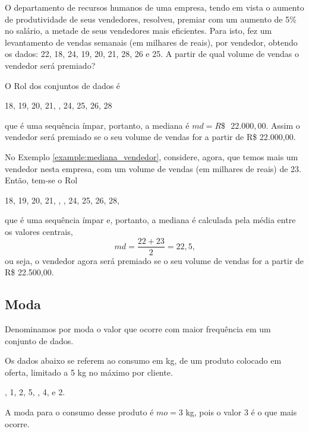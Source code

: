\documentclass[11pt,fleqn]{book}
\numberwithin{mpicture}{chapter}
\numberwithin{mtable}{chapter}
\numberwithin{mframe}{chapter}
\begin{document}
\begin{example}
	\label{example:mediana_vendedor}
	O departamento de recursos humanos de uma empresa, tendo em vista o aumento de produtividade de seus vendedores, resolveu, premiar com um aumento de 5\% no salário, a metade de seus vendedores mais eficientes. Para isto, fez um levantamento de vendas semanais (em milhares de reais), por vendedor, obtendo os dados: 22, 18, 24, 19, 20, 21, 28, 26 e 25. A partir de qual volume de vendas o vendedor será premiado?
	
	O Rol dos conjuntos de dados é
	\begin{center}
		18, 19, 20, 21, , 24, 25, 26, 28\text{,}
	\end{center}
	que é uma sequência ímpar, portanto, a mediana é $md=R\$\text{ }22.000,00$. Assim o vendedor será premiado se o seu volume de vendas for a partir de R\$ 22.000,00.
\end{example}

\begin{example}
	No Exemplo \ref{example:mediana_vendedor}, considere, agora, que temos mais um vendedor nesta empresa, com um volume de vendas (em milhares de reais) de 23. Então, tem-se o Rol
	\begin{center}
		18, 19, 20, 21, , , 24, 25, 26, 28,
	\end{center}
	que é uma sequência ímpar e, portanto, a mediana é calculada pela média entre os valores centrais,
	\[
		md=\frac{22 + 23}{2}=22,5\text{,}
	\]
	ou seja, o vendedor agora será premiado se o seu volume de vendas for a partir de R\$ 22.500,00.
\end{example}

\subsection{Moda}

Denominamos por moda o valor que ocorre com maior frequência em um conjunto de dados.

\begin{example}
	Os dados abaixo se referem ao consumo em kg, de um produto colocado em oferta, limitado a 5 kg no máximo por cliente.
	\begin{center}
		, 1, 2, 5, , 4,  e 2.
	\end{center}
	
	A moda para o consumo desse produto é $mo=3$ kg, pois o valor 3 é o que mais ocorre.
\end{example}
\end{document}
